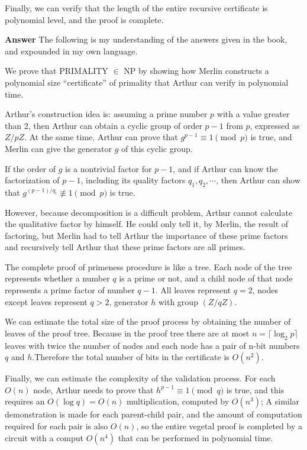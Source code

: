 \documentclass[11pt]{article}
\begin{document}
Finally, we can verify that the length of the entire recursive certificate is polynomial level, and the proof is complete.

{\bf Answer } The following is my understanding of the answers given in the book, and expounded in my own language.

We prove that PRIMALITY $\in$ NP by showing how Merlin constructs
a polynomial size ``certiﬁcate'' of primality that Arthur can verify in polynomial time.

Arthur's construction idea is: assuming a prime number $p$ with a value greater than $2$, then Arthur can obtain a cyclic group of order $p-1$ from $p$, expressed as $Z/pZ$. At the same time, Arthur can prove that $g^{p-1}\equiv1\pmod p$ is true, and Merlin can give the generator $g$ of this cyclic group.

If the order of $g$ is a nontrivial factor for $p-1$, and if Arthur can know the factorization of $p-1$, including its quality factors $q_1, q_2, \cdots$, then Arthur can show that $g^{(p-1)/q_i}\not\equiv1\pmod p$ is true. 

However, because decomposition is a difficult problem, Arthur cannot calculate the qualitative factor by himself. He could only tell it, by Merlin, the result of factoring, but Merlin had to tell Arthur the importance of these prime factors and recursively tell Arthur that these prime factors are all primes. 

The complete proof of primeness procedure is like a tree. Each node of the tree represents whether a number $q$ is a prime or not, and a child node of that node represents a prime factor of number $q-1$. All leaves represent $q = 2$, nodes except leaves represent $q>2$, generator $h$ with group $(Z/qZ)$.

We can estimate the total size of the proof process by obtaining the number of leaves of the proof tree. Because in the proof tree there are at most $n = \lceil \log_2p \rceil$ leaves with twice the number of nodes and each node has a pair of n-bit numbers $q$ and $h$.Therefore the total number of bits in the certificate is $O(n^2)$.

Finally, we can estimate the complexity of the validation process. For each $O(n)$ node, Arthur needs to prove that $h^{p-1}\equiv1\pmod q$ is true, and this requires an $O(\log q) = O (n)$ multiplication, computed by $O (n^3)$; A similar demonstration is made for each parent-child pair, and the amount of computation required for each pair is also $O(n)$, so the entire vegetal proof is completed by a circuit with a comput $O(n^4)$ that can be performed in polynomial time.
\end{document}

